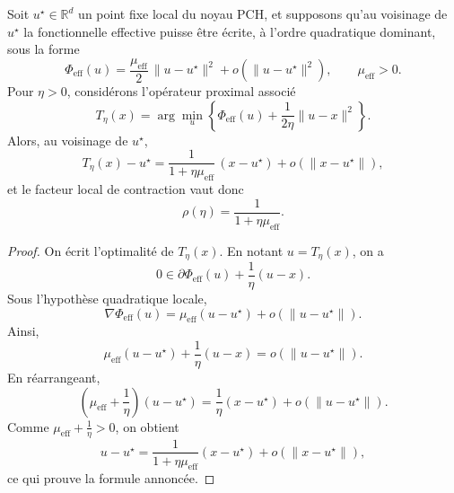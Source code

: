 































































\begin{theorem}
\label{thm:effective-law}
Soit $u^\star \in \mathbb R^d$ un point fixe local du noyau PCH, et supposons qu'au voisinage de $u^\star$ la fonctionnelle effective puisse être écrite, à l'ordre quadratique dominant, sous la forme
\[
\Phi_{\mathrm{eff}}(u)
=
\frac{\mu_{\mathrm{eff}}}{2}\,\|u-u^\star\|^2
+
o\!\left(\|u-u^\star\|^2\right),
\qquad \mu_{\mathrm{eff}}>0.
\]
Pour $\eta>0$, considérons l'opérateur proximal associé
\[
T_\eta(x)
=
\arg\min_u
\left\{
\Phi_{\mathrm{eff}}(u)
+
\frac{1}{2\eta}\|u-x\|^2
\right\}.
\]
Alors, au voisinage de $u^\star$,
\[
T_\eta(x)-u^\star
=
\frac{1}{1+\eta \mu_{\mathrm{eff}}}\,(x-u^\star)
+
o\!\left(\|x-u^\star\|\right),
\]
et le facteur local de contraction vaut donc
\[
\rho(\eta)=\frac{1}{1+\eta\mu_{\mathrm{eff}}}.
\]
\end{theorem}

\begin{proof}
On écrit l'optimalité de $T_\eta(x)$. En notant $u=T_\eta(x)$, on a
\[
0 \in \partial \Phi_{\mathrm{eff}}(u)+\frac{1}{\eta}(u-x).
\]
Sous l'hypothèse quadratique locale,
\[
\nabla \Phi_{\mathrm{eff}}(u)=\mu_{\mathrm{eff}}(u-u^\star)+o(\|u-u^\star\|).
\]
Ainsi,
\[
\mu_{\mathrm{eff}}(u-u^\star)+\frac{1}{\eta}(u-x)
=
o(\|u-u^\star\|).
\]
En réarrangeant,
\[
\left(\mu_{\mathrm{eff}}+\frac{1}{\eta}\right)(u-u^\star)
=
\frac{1}{\eta}(x-u^\star)
+
o(\|u-u^\star\|).
\]
Comme $\mu_{\mathrm{eff}}+\frac{1}{\eta}>0$, on obtient
\[
u-u^\star
=
\frac{1}{1+\eta\mu_{\mathrm{eff}}}(x-u^\star)
+
o\!\left(\|x-u^\star\|\right),
\]
ce qui prouve la formule annoncée.
\end{proof}

